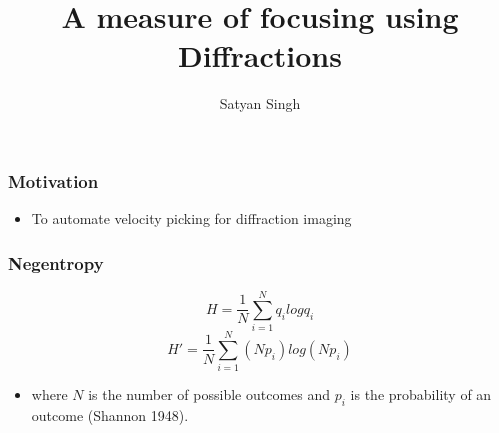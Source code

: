 

\title[]{A measure of focusing using Diffractions}
\subtitle{}
\author[]{Satyan Singh}
\date{}
\logo{}
\Large

\def\big#1{\begin{center} \LARGE \textbf{#1} \end{center}}
\def\cen#1{\begin{center}        \textbf{#1} \end{center}}

 { \cwpcover }


\begin{frame}
   \begin{multicols}{2}
      {}
      {}
 \end{multicols}
\end{frame}

\begin{frame} \frametitle{Motivation}

\begin{itemize}
   \item To automate velocity picking for diffraction imaging
\end{itemize}

\end{frame}
\begin{frame} \frametitle{Negentropy}


   \begin{equation} 
      H =\frac{1}{N} \sum_{i=1}^{N} q_i log q_i
   \end{equation}
  \begin{equation}
        H'= \frac{1}{N} \sum_{i=1}^{N} (Np_i) log(Np_i)
  \end{equation}
\begin{itemize}
 \item where $N$ is the number of possible outcomes and $p_i$ is the probability of an outcome (Shannon 1948).
\end{itemize}

\end{frame}


